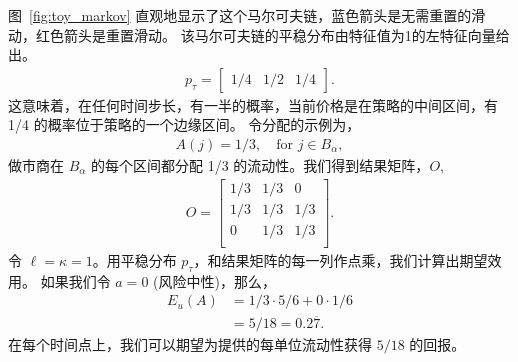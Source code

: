 \documentclass[sigconf, dvipsnames]{acmart}
\newcommand{\dcp}[1]{\textcolor{blue}{{\scriptsize{David:}}#1}}
\begin{document}
图~\ref{fig:toy_markov} 直观地显示了这个马尔可夫链，蓝色箭头是无需重置的滑动，红色箭头是重置滑动。
该马尔可夫链的平稳分布由特征值为1的左特征向量给出。
\begin{align*}
    p_{\tau} = 
    \begin{bmatrix}
    1/4 & 1/2 & 1/4
    \end{bmatrix}.
\end{align*}
这意味着，在任何时间步长，有一半的概率，当前价格是在策略的中间区间，有 1/4 的概率位于策略的一个边缘区间。
令分配的示例为，
\begin{align*}\label{eq:toy_allocation}
    A(j) = 1/3, \quad \textrm{for } j \in B_{\alpha},
\end{align*}
做市商在 $B_{\alpha}$ 的每个区间都分配 1/3 的流动性。我们得到结果矩阵，$O$,
\begin{align*}
    O = 
    \begin{bmatrix}
    1/3 & 1/3 & 0 \\ 
    1/3 & 1/3 & 1/3 \\ 
    0 & 1/3 & 1/3\\
    \end{bmatrix}.
\end{align*}
令 $\ell = \kappa = 1$。用平稳分布 $p_{\tau}$，和结果矩阵的每一列作点乘，我们计算出期望效用。
如果我们令 $a=0$ (风险中性)，那么，
\begin{align*}
    E_u(A) &= 1/3 \cdot 5/6 + 0 \cdot 1/6 \\
    &= 5/18 = 0.2\overline{7}.
\end{align*}
在每个时间点上，我们可以期望为提供的每单位流动性获得 $5/18$ 的回报。

\end{document}
